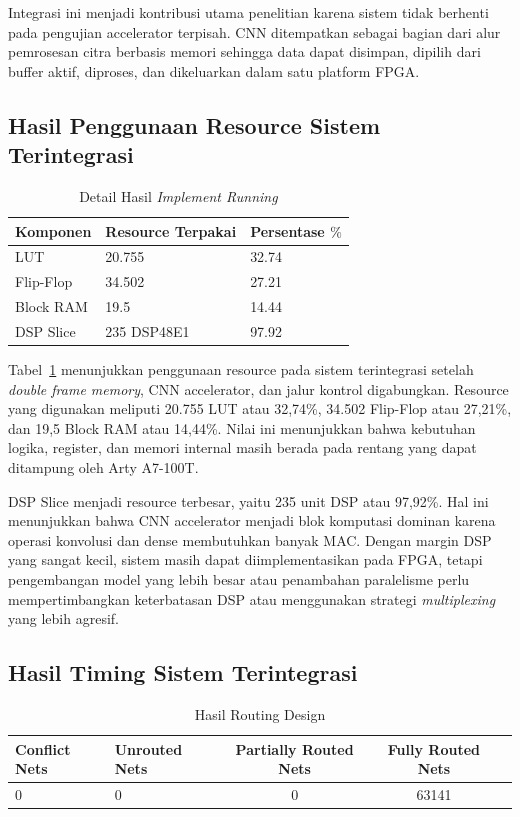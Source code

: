 Integrasi ini menjadi kontribusi utama penelitian karena sistem tidak berhenti pada pengujian accelerator terpisah. CNN ditempatkan sebagai bagian dari alur pemrosesan citra berbasis memori sehingga data dapat disimpan, dipilih dari buffer aktif, diproses, dan dikeluarkan dalam satu platform FPGA.

    \subsection{Hasil Penggunaan Resource Sistem Terintegrasi}
	\begin{table}[H]
		\centering
		\caption{Detail Hasil \emph{Implement Running}}
		\label{implement-run-fullimplementation}
		\begin{tabular}{|l|l|l|}
			\hline
			\textbf{Komponen} & \textbf{Resource Terpakai} & \textbf{Persentase} $\%$ \\
			\hline
			LUT & 20.755 & 32.74 \\
			Flip-Flop & 34.502 & 27.21 \\
			Block RAM & 19.5 & 14.44 \\
			DSP Slice & 235 DSP48E1 & 97.92 \\
			\hline
      	\end{tabular}
  	\end{table}

Tabel~\ref{implement-run-fullimplementation} menunjukkan penggunaan resource pada sistem terintegrasi setelah \emph{double frame memory}, CNN accelerator, dan jalur kontrol digabungkan. Resource yang digunakan meliputi 20.755 LUT atau 32,74\%, 34.502 Flip-Flop atau 27,21\%, dan 19,5 Block RAM atau 14,44\%. Nilai ini menunjukkan bahwa kebutuhan logika, register, dan memori internal masih berada pada rentang yang dapat ditampung oleh Arty A7-100T.

DSP Slice menjadi resource terbesar, yaitu 235 unit DSP atau 97,92\%. Hal ini menunjukkan bahwa CNN accelerator menjadi blok komputasi dominan karena operasi konvolusi dan dense membutuhkan banyak MAC. Dengan margin DSP yang sangat kecil, sistem masih dapat diimplementasikan pada FPGA, tetapi pengembangan model yang lebih besar atau penambahan paralelisme perlu mempertimbangkan keterbatasan DSP atau menggunakan strategi \emph{multiplexing} yang lebih agresif.

    \subsection{Hasil Timing Sistem Terintegrasi}
	\begin{table}[htbp]
	\centering
		\caption{Hasil Routing Design}
		\vspace{2mm}
		\small
		\begin{tabular}{llccc}
			\toprule
			\textbf{Conflict Nets} 	&
			\textbf{Unrouted Nets} &
			\textbf{Partially Routed Nets} &
			\textbf{Fully Routed Nets} \\
			\midrule
			0 &
			0 &
			0 &
			63141 \\
			\bottomrule
		\end{tabular}
	\end{table}

